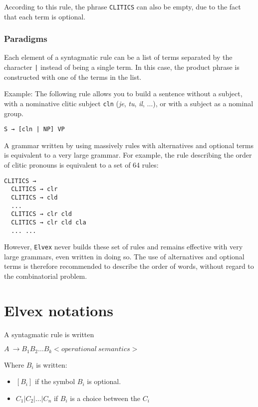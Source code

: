 \documentclass[11pt]{article}
\begin{document}
According to this rule, the phrase \texttt{CLITICS} can also be empty,
due to the fact that each term is optional.

\subsubsection*{Paradigms}

Each element of a syntagmatic rule can be a list of terms
separated by the character \verb#|# instead of being a single term. In this
case, the product phrase is constructed with one of the terms in the list.

Example:
The following rule allows you to build a sentence without a subject, with a
nominative clitic subject \texttt{cln} (\textit{je}, \textit{tu},
\textit{il}, $\dots$), or with a subject as a nominal group.

\begin{lstlisting}[numbers=none]
S → [cln | NP] VP
\end{lstlisting}

A grammar written by using massively rules with alternatives and
optional terms is equivalent to a very large grammar.  For example,
the rule describing the order of clitic pronouns is equivalent to a
set of 64 rules:
 
\begin{lstlisting}[numbers=none]
  CLITICS → 
  CLITICS → clr 
  CLITICS → cld 
  ...
  CLITICS → clr cld 
  CLITICS → clr cld cla
  ... ...
\end{lstlisting}

However, \texttt{Elvex} never builds these set of rules and remains
effective with very large grammars, even written in doing so.  The use
of alternatives and optional terms is therefore recommended to
describe the order of words, without regard to the combinatorial
problem.

\section{Elvex notations}
 
A syntagmatic rule is written 

$A~ \rightarrow B_1 B_2 \dots B_k <operational~semantics>$
 
Where $B_i$ is written:

\begin{itemize}
\item $[ B_i ]$ if the symbol $B_i$ is optional.
\item $C_1 | C_2 | \dots | C_n$ if $B_i$ is a choice between the $C_i$
\end{itemize}
 
\end{document}
